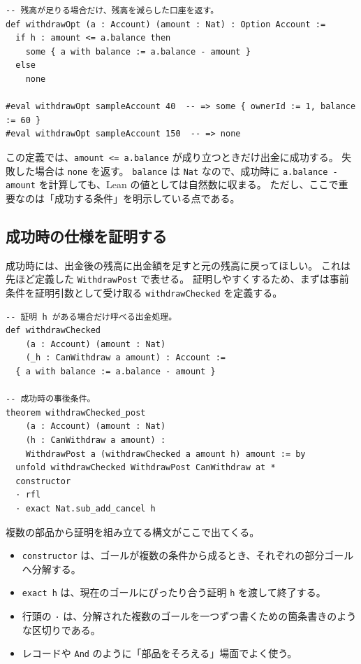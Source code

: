 \begin{listing}[htbp]
\begin{verbatim}
-- 残高が足りる場合だけ、残高を減らした口座を返す。
def withdrawOpt (a : Account) (amount : Nat) : Option Account :=
  if h : amount <= a.balance then
    some { a with balance := a.balance - amount }
  else
    none

#eval withdrawOpt sampleAccount 40  -- => some { ownerId := 1, balance := 60 }
#eval withdrawOpt sampleAccount 150  -- => none
\end{verbatim}
\caption{失敗しうる出金処理}
\label{lst:ch04_withdraw_option}
\end{listing}

この定義では、\texttt{amount <= a.balance} が成り立つときだけ出金に成功する。
失敗した場合は \texttt{none} を返す。
\texttt{balance} は \texttt{Nat} なので、成功時に \texttt{a.balance - amount} を計算しても、Lean の値としては自然数に収まる。
ただし、ここで重要なのは「成功する条件」を明示している点である。

\subsection{成功時の仕様を証明する}

成功時には、出金後の残高に出金額を足すと元の残高に戻ってほしい。
これは先ほど定義した \texttt{WithdrawPost} で表せる。
証明しやすくするため、まずは事前条件を証明引数として受け取る \texttt{withdrawChecked} を定義する。

\begin{listing}[htbp]
\begin{verbatim}
-- 証明 h がある場合だけ呼べる出金処理。
def withdrawChecked
    (a : Account) (amount : Nat)
    (_h : CanWithdraw a amount) : Account :=
  { a with balance := a.balance - amount }

-- 成功時の事後条件。
theorem withdrawChecked_post
    (a : Account) (amount : Nat)
    (h : CanWithdraw a amount) :
    WithdrawPost a (withdrawChecked a amount h) amount := by
  unfold withdrawChecked WithdrawPost CanWithdraw at *
  constructor
  · rfl
  · exact Nat.sub_add_cancel h
\end{verbatim}
\caption{事前条件を受け取る出金処理と成功時仕様}
\label{lst:ch04_withdraw_checked}
\end{listing}

\begin{syntaxbox}
複数の部品から証明を組み立てる構文がここで出てくる。
\begin{itemize}
\item \texttt{constructor} は、ゴールが複数の条件から成るとき、それぞれの部分ゴールへ分解する。
\item \texttt{exact h} は、現在のゴールにぴったり合う証明 \texttt{h} を渡して終了する。
\item 行頭の \texttt{·} は、分解された複数のゴールを一つずつ書くための箇条書きのような区切りである。
\item レコードや \texttt{And} のように「部品をそろえる」場面でよく使う。
\end{itemize}
\end{syntaxbox}



